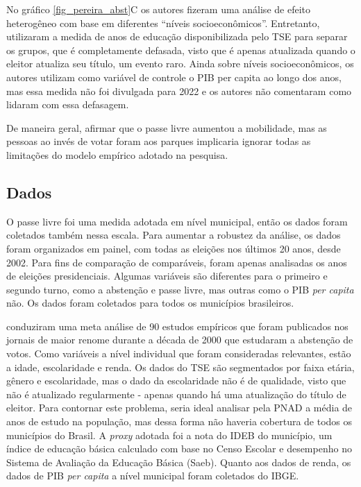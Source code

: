 No gráfico \ref{fig_pereira_abst}C os autores fizeram uma análise de efeito heterogêneo com base em diferentes ``níveis socioeconômicos''. Entretanto, utilizaram a medida de anos de educação disponibilizada pelo TSE para separar os grupos, que é completamente defasada, visto que é apenas atualizada quando o eleitor atualiza seu título, um evento raro. Ainda sobre níveis socioeconômicos, os autores utilizam como variável de controle o PIB per capita ao longo dos anos, mas essa medida não foi divulgada para 2022 e os autores não comentaram como lidaram com essa defasagem.

De maneira geral, afirmar que o passe livre aumentou a mobilidade, mas as pessoas ao invés de votar foram aos parques implicaria ignorar todas as limitações do modelo empírico adotado na pesquisa.

\subsection{Dados}

O passe livre foi uma medida adotada em nível municipal, então os dados foram coletados também nessa escala. Para aumentar a robustez da análise, os dados foram organizados em painel, com todas as eleições nos últimos 20 anos, desde 2002. Para fins de comparação de comparáveis, foram apenas analisadas os anos de eleições presidenciais. Algumas variáveis são diferentes para o primeiro e segundo turno, como a abstenção e passe livre, mas outras como o PIB \textit{per capita} não. Os dados foram coletados para todos os municípios brasileiros.



\textcite{smets2013embarrassment} conduziram uma meta análise de 90 estudos empíricos que foram publicados nos jornais de maior renome durante a década de 2000 que estudaram a abstenção de votos. Como variáveis a nível individual que foram consideradas relevantes, estão a idade, escolaridade e renda. Os dados do TSE são segmentados por faixa etária, gênero e escolaridade, mas o dado da escolaridade não é de qualidade, visto que não é atualizado regularmente - apenas quando há uma atualização do título de eleitor. Para contornar este problema, seria ideal analisar pela PNAD a média de anos de estudo na população, mas dessa forma não haveria cobertura de todos os municípios do Brasil. A \textit{proxy} adotada foi a nota do IDEB do município, um índice de educação básica calculado com base no Censo Escolar e desempenho no Sistema de Avaliação da Educação Básica (Saeb). Quanto aos dados de renda, os dados de PIB \textit{per capita} a nível municipal foram coletados do IBGE.

